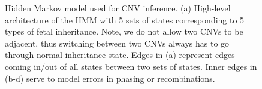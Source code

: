 \begin{figure}[h]
\caption{Hidden Markov model used for CNV inference. (a) High-level architecture of the HMM with 5 sets of states corresponding to 5 types of fetal inheritance. Note, we do not allow two CNVs to be adjacent, thus switching between two CNVs always has to go through normal inheritance state. Edges in (a) represent edges coming in/out of all states between two sets of states. Inner edges in (b-d) serve to model errors in phasing or recombinations.}\label{fig:hmm_main}
\end{figure}
